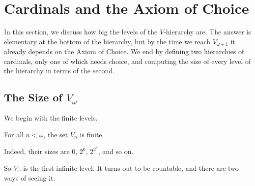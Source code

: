 \section{Cardinals and the Axiom of Choice}\label{Ch1:Sec:Cardinals}

In this section, we discuss how big the levels of the $V$-hierarchy are. The answer is elementary at the bottom of the hierarchy, but by the time we reach $V_{\omega + 1}$ it already depends on the Axiom of Choice. We end by defining two hierarchies of cardinals, only one of which needs choice, and computing the size of every level of the hierarchy in terms of the second.

\subsection{The Size of $V_{\omega}$}

We begin with the finite levels.

\begin{boxproposition}
    For all $n < \omega$, the set $V_{n}$ is finite.
\end{boxproposition}

Indeed, their sizes are $0$, $2^0$, $2^{2^{0}}$, and so on.

So $V_{\omega}$ is the first infinite level. It turns out to be countable, and there are two ways of seeing it.

